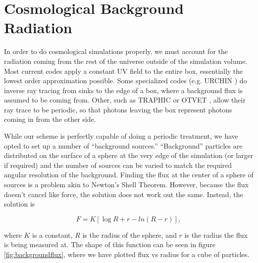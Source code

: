 %

\section{Cosmological Background Radiation}
\label{sec:cosmobackground}

In order to do cosmological simulations properly, we must account for the radiation coming from the rest of the universe outside of the simulation volume. Most current codes apply a constant UV field to the entire box, essentially the lowest order approximation possible. Some specialized codes (e.g. URCHIN \citet{altayTheuns13}) do inverse ray tracing from sinks to the edge of a box, where a background flux is assumed to be coming from. Other, such as TRAPHIC \citep{pawlikSchaye08} or OTVET \citep{petkovaSpringel09}, allow their ray trace to be periodic, so that photons leaving the box represent photons coming in from the other side.

While our scheme is perfectly capable of doing a periodic treatment, we have opted to set up a number of ``background sources.'' ``Background'' particles are distributed on the surface of a sphere at the very edge of the simulation (or larger if required) and the number of sources can be varied to match the required angular resolution of the background. Finding the flux at the center of a sphere of sources is a problem akin to Newton's Shell Theorem. However, because the flux doesn't cancel like force, the solution does not work out the same. Instead, the solution is

\begin{equation}
\label{eq:shellflux}
F = K\left[ \log{R+r} - ln(R-r) \right],
\end{equation}

where $K$ is a constant, $R$ is the radius of the sphere, and $r$ is the radius the flux is being measured at. The shape of this function can be seen in figure \ref{fig:backgroundflux}, where we have plotted flux vs radius for a cube of particles.

